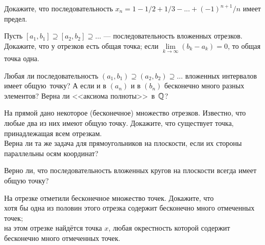 \documentclass[a4paper,11pt]{article}
\begin{document}
Докажите, что последовательность
$\displaystyle{x_n=1-1/2+1/3-...+(-1)^{n+1}/n}$
имеет предел.





 Пусть
$
[a_1,b_1]\supseteq [a_2,b_2] \supseteq \dots
$
--- последовательность вложенных отрезков. Докажите, что
 у отрезков есть общая точка;
 если $\lim\limits_{k\to\infty} (b_k-a_k) = 0$,
то общая точка %
одна.


Любая ли последовательность $(a_1,b_1)\supseteq(a_2,b_2)\supseteq
\dots$
вложенных интервалов имеет общую~точ\-ку?
А если %
и %
в $(a_n)$ и
в $(b_n)$
бесконечно много разных элементов?
 Верна ли <<аксиома полноты>>~в~$\mathbb{Q}$?


  На прямой дано некоторое (бесконечное) множество отрезков.
Известно, что любые два из них имеют общую точку.
Докажите, что существует точка, принадлежащая всем отрезкам.\\
 Верна ли та же задача для прямоугольников на плоскости, если их стороны параллельны осям координат?

 Верно ли, что последовательность вложенных кругов на плоскости всегда имеет общую точку?

На отрезке отметили бесконечное множество точек. Докажите, что\\
 хотя бы одна из половин этого отрезка содержит бесконечно много отмеченных
точек;\\
 на этом отрезке
найдётся точка $x$, %
любая окрестность %
которой содержит бесконечно много отмеченных
точек.

\end{document}
